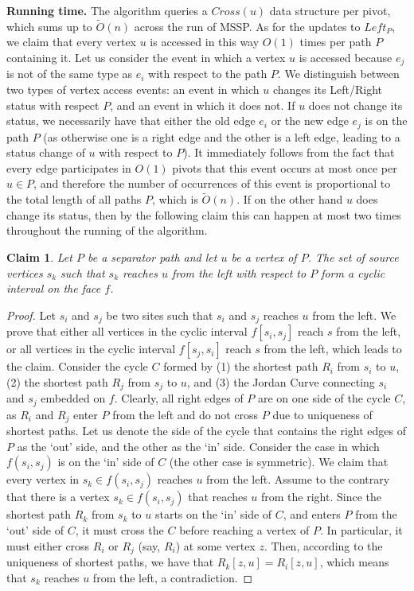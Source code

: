 \documentclass{article}
\newtheorem{claim}{Claim}
\newcommand{\Otild}{\tilde{O}}
\begin{document}
    \medskip
\noindent
{\bf Running time.}
    The algorithm queries a $Cross(u)$ data structure per pivot, which sums up to $\Otild(n)$ across the run of MSSP.
    As for the updates to $Left_P$, we claim that every vertex $u$ is accessed in this way $O(1)$ times per path $P$ containing it.
    Let us consider the event in which a vertex $u$ is accessed because $e_j$ is not of the same type as $e_i$ with respect to the path $P$.
    We distinguish between two types of vertex access events: an event in which $u$ changes its Left/Right status with respect $P$, and an event in which it does not.
    If $u$ does not change its status, we necessarily have that either the old edge $e_i$ or the new edge $e_j$ is on the path $P$ (as otherwise one is a right edge and the other is a left edge, leading to a status change of $u$ with respect to $P$).
    It immediately follows from the fact that every edge participates in $O(1)$ pivots that this event occurs at most once per $u\in P$, and therefore the number of occurrences of this event is proportional to the total length of all paths $P$, which is $\Otild(n)$.
   If on the other hand $u$ does change its status, then by the following claim this can happen at most two times throughout the running of the algorithm.


    \begin{claim}\label{clm:cyclicleftright}
        Let $P$ be a separator path and let $u$ be a vertex of $P$.
        The set of source vertices $s_k$ such that $s_k$ reaches $u$ from the left with respect to $P$ form a cyclic interval on the face $f$.
    \end{claim}
    \begin{proof}
        Let $s_i$ and $s_j$ be two sites such that $s_i$ and $s_j$ reaches $u$ from the left.
        We prove that either all vertices in the cyclic interval $f[s_i,s_j]$ reach $s$ from the left, or all vertices in the cyclic interval $f[s_j,s_i]$ reach $s$ from the left, which leads to the claim.
        Consider the cycle $C$ formed by (1) the shortest path $R_i$ from $s_i$ to $u$, (2) the shortest path $R_j$ from $s_j$ to $u$,  and (3) the Jordan Curve connecting $s_i$ and $s_j$ embedded on $f$.
        Clearly, all right edges of $P$ are on one side of the cycle $C$, as $R_i$ and $R_j$ enter $P$ from the left and do not cross $P$ due to uniqueness of shortest paths.
        Let us denote the side of the cycle that contains the right edges of $P$ as the `out' side, and the other as the `in' side.
        Consider the case in which $f(s_i,s_j)$ is on the `in' side of $C$ (the other case is symmetric).
        We claim that every vertex in $s_k \in f(s_i,s_j)$  reaches $u$ from the left.
        Assume to the contrary that there is a vertex $s_k \in f(s_i,s_j)$ that reaches $u$ from the right.
        Since the shortest path $R_k$ from $s_k$ to $u$ starts on the `in' side of $C$, and enters $P$ from the `out' side of $C$, it must cross the $C$ before reaching a vertex of $P$.
        In particular, it must either cross $R_i$ or $R_j$ (say, $R_i$) at some vertex $z$.
        Then, according to the uniqueness of shortest paths, we have that $R_k[z,u]=R_i[z,u]$, which means that $s_k$ reaches $u$ from the left, a contradiction.
    \end{proof}
\end{document}
